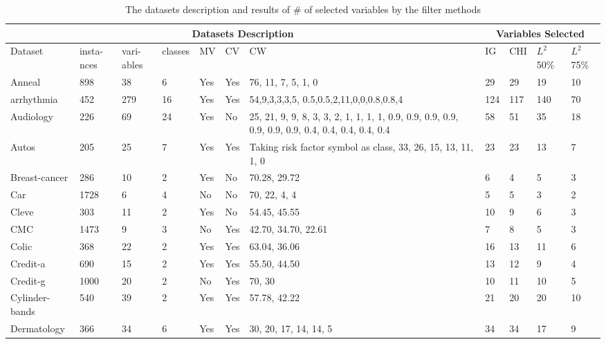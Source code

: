 \documentclass[review]{elsarticle}
\begin{document}
\begin{table}[p]
	\centering
	\caption[short tbl1 table1]{The datasets description and results of \# of selected variables by the filter methods}
	\label{tab:tbl1}
	
\begin{tabular}{|p{1.5cm}|p{0.5cm}|p{0.5cm}|p{0.5cm}|p{0.5cm}|p{0.5cm}|p{3cm}|p{0.5cm}|p{0.5cm}|p{1cm}|p{1cm}|}
	
	
	
	\hline 
	\multicolumn{7}{|c|}{Datasets Description} &
	\multicolumn{4}{|c|}{ Variables Selected } \\ 

\hline Dataset & insta-nces & vari-ables & classes & MV & CV & CW & IG & CHI & $ L^2 $ 50\%  & $ L^2 $ 75\% \\ 
	\hline Anneal & 898 & 38 & 6 & Yes & Yes & 76,  11, 7, 5, 1, 0 & 29 & 29 & 19 & 10 \\ 
	\hline arrhythmia & 452 & 279 & 16 & Yes & Yes & 54,9,3,3,3,5, 0.5,0.5,2,11,0,0,0.8,0.8,4 & 124 & 117 & 140 & 70 \\ 
\hline Audiology & 226 & 69 & 24 & Yes & No & 25,  21, 9, 9, 8, 3, 3, 2, 1, 1, 1, 1,  0.9, 0.9, 0.9, 0.9, 0.9, 0.9, 0.9, 0.4, 0.4, 0.4, 0.4,  0.4 & 58 & 51 & 35 & 18 \\ 
\hline Autos & 205 & 25 & 7 & Yes & Yes & Taking risk factor symbol as class,  33, 26, 15, 13, 11, 1, 0 & 23 & 23 & 13 & 7 \\ 
\hline Breast-cancer & 286 & 10 & 2 & Yes & No & 70.28, 29.72 & 6 & 4 & 5 & 3 \\ 
\hline Car & 1728 & 6 & 4 & No & No & 70,  22, 4, 4 & 5 & 5 & 3 & 2 \\ 
\hline Cleve & 303 & 11 & 2 & Yes & No & 54.45, 45.55 & 10 & 9 & 6 & 3 \\ 
\hline CMC & 1473 & 9 & 3 & No & Yes & 42.70, 34.70, 22.61  & 7 & 8 & 5 & 3 \\ 
\hline Colic & 368 & 22 & 2 & Yes & Yes & 63.04, 36.06 & 16 & 13 & 11 & 6 \\ 
\hline Credit-a & 690 & 15 & 2 & Yes & Yes & 55.50, 44.50 & 13 & 12 & 9 & 4 \\ 
\hline Credit-g & 1000 & 20 & 2 & No & Yes & 70, 30 & 10 & 11 & 10 & 5 \\
\hline Cylinder-bands & 540 & 39 & 2 & Yes & Yes & 57.78, 42.22 & 21 & 20 & 20 & 10 \\ 
\hline Dermatology & 366 & 34 & 6 & Yes & Yes & 30, 20, 17, 14, 14, 5 &  34 & 34 & 17 & 9 \\

\end{tabular}
\end{table}
\end{document}
